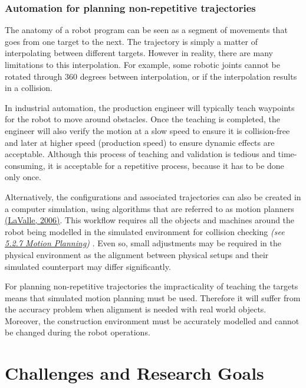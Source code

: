 \documentclass[11pt]{book}
\begin{document}
\subsection{Automation for planning non-repetitive trajectories}

The anatomy of a robot program can be seen as a segment of movements that goes from one target to the next. The trajectory is simply a matter of interpolating between different targets. However in reality, there are many limitations to this interpolation. For example, some robotic joints cannot be rotated through 360 degrees between interpolation, or if the interpolation results in a collision.

In industrial automation, the production engineer will typically teach waypoints for the robot to move around obstacles. Once the teaching is completed, the engineer will also verify the motion at a slow speed to ensure it is collision-free and later at higher speed (production speed) to ensure dynamic effects are acceptable. Although this process of teaching and validation is tedious and time-consuming, it is acceptable for a repetitive process, because it has to be done only once. 

Alternatively, the configurations and associated trajectories can also be created in a computer simulation, using algorithms that are referred to as motion planners \href{https://www.zotero.org/google-docs/?016btu}{(LaValle, 2006)}. This workflow requires all the objects and machines around the robot being modelled in the simulated environment for collision checking \textit{(see \underline{5.2.7 Motion Planning})} . Even so, small adjustments may be required in the physical environment as the alignment between physical setups and their simulated counterpart may differ significantly.

For planning non-repetitive trajectories the impracticality of teaching the targets means that simulated motion planning must be used. Therefore it will suffer from the accuracy problem when alignment is needed with real world objects. Moreover, the construction environment must be accurately modelled and cannot be changed during the robot operations. 

\vspace{1\baselineskip}

\newpage

\chapter{Challenges and Research Goals}
\end{document}
